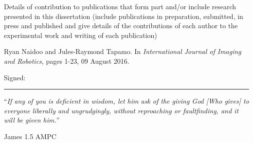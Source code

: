 \documentclass[
11pt, %
english, %
onehalfspacing, %
liststotoc, %
headsepline, %
]{MastersDoctoralThesis} %
\newenvironment{definition}[1][Definition]{\begin{trivlist}
		\item[\hskip \labelsep {\bfseries #1}]}{\end{trivlist}}
\begin{document}
\cleardoublepage

\begin{declarationpublication}
	\addchaptertocentry{\decpublicationname}
	
	Details of contribution to publications that form part and/or include research presented in this dissertation (include publications in preparation, submitted, in press and published and give details of the contributions of each author to the experimental work and writing of each publication)
\begin{definition}[A Preprocessing Scheme for Fluorescence Microscopy Image Segmentation.]
	Ryan Naidoo and Jules-Raymond Tapamo. In \textit{International Journal of Imaging and Robotics}, pages 1-23, 09 August 2016.
\end{definition}
	
	\vfill
	
	\noindent Signed:\\
	\rule[0.5em]{25em}{0.5pt} %
\end{declarationpublication}

\cleardoublepage


\vspace*{0.2\textheight}



\noindent\enquote{\itshape If any of you is deficient in wisdom, let him ask of the giving God [Who gives] to everyone liberally and ungrudgingly, without reproaching or faultfinding, and it will be given him.}\bigbreak

\hfill James 1.5 AMPC

\end{document}
